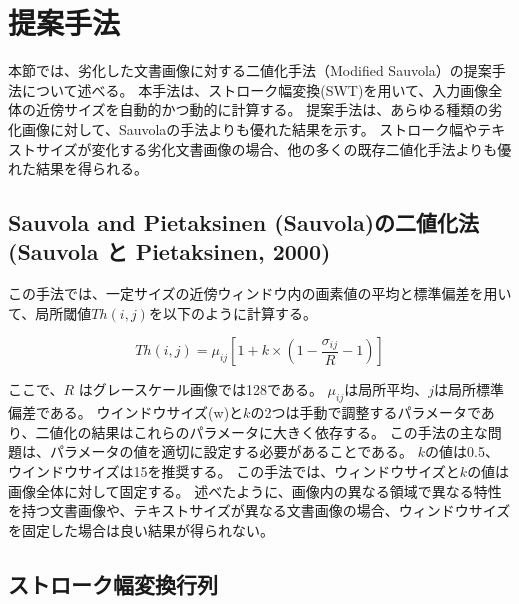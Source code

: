 \documentclass[uplatex, twocolumn,10pt]{jsarticle}
\begin{document}
\section{提案手法}

本節では、劣化した文書画像に対する二値化手法（Modified Sauvola）の提案手法について述べる。
本手法は、ストローク幅変換(SWT)を用いて、入力画像全体の近傍サイズを自動的かつ動的に計算する。
提案手法は、あらゆる種類の劣化画像に対して、Sauvolaの手法よりも優れた結果を示す。
ストローク幅やテキストサイズが変化する劣化文書画像の場合、他の多くの既存二値化手法よりも優れた結果を得られる。



\subsection{Sauvola and Pietaksinen (Sauvola)の二値化法 (Sauvola と Pietaksinen, 2000)}

この手法では、一定サイズの近傍ウィンドウ内の画素値の平均と標準偏差を用いて、局所閾値$Th(i, j)$を以下のように計算する。

\begin{equation}\label{eq1}
    Th(i, j) = \mu_{ij}[1+k\times(1-\frac{\sigma_{ij}}{R}-1)]
\end{equation}

ここで、$R$ はグレースケール画像では128である。
$\mu_{ij}$は局所平均、$j$は局所標準偏差である。
ウインドウサイズ(w)と$k$の2つは手動で調整するパラメータであり、二値化の結果はこれらのパラメータに大きく依存する。
この手法の主な問題は、パラメータの値を適切に設定する必要があることである。
$k$の値は0.5、ウインドウサイズは15を推奨する。
この手法では、ウィンドウサイズと$k$の値は画像全体に対して固定する。
述べたように、画像内の異なる領域で異なる特性を持つ文書画像や、テキストサイズが異なる文書画像の場合、ウィンドウサイズを固定した場合は良い結果が得られない。


\subsection{ストローク幅変換行列}\label{sec2.2}
\end{document}
